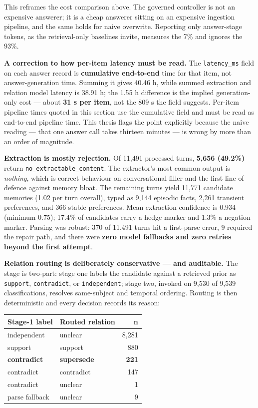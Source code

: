 This reframes the cost comparison above. The governed controller is not
an expensive answerer; it is a cheap answerer sitting on an expensive
ingestion pipeline, and the same holds for naive overwrite. Reporting
only answer-stage tokens, as the retrieval-only baselines invite,
measures the 7\% and ignores the 93\%.

\textbf{A correction to how per-item latency must be read.} The
\texttt{latency\_ms} field on each answer record is \textbf{cumulative
end-to-end} time for that item, not answer-generation time. Summing it
gives 40.46 h, while summed extraction and relation model latency is
38.91 h; the 1.55 h difference is the implied generation-only cost ---
about \textbf{31 s per item}, not the 809 s the field suggests. Per-item
pipeline times quoted in this section use the cumulative field and must
be read as end-to-end pipeline time. This thesis flags the point
explicitly because the naive reading --- that one answer call takes
thirteen minutes --- is wrong by more than an order of magnitude.

\textbf{Extraction is mostly rejection.} Of 11,491 processed turns,
\textbf{5,656 (49.2\%)} return \texttt{no\_extractable\_content}. The
extractor's most common output is \emph{nothing}, which is correct
behaviour on conversational filler and the first line of defence against
memory bloat. The remaining turns yield 11,771 candidate memories (1.02
per turn overall), typed as 9,144 episodic facts, 2,261 transient
preferences, and 366 stable preferences. Mean extraction confidence is
0.934 (minimum 0.75); 17.4\% of candidates carry a hedge marker and
1.3\% a negation marker. Parsing was robust: 370 of 11,491 turns hit a
first-parse error, 9 required the repair path, and there were
\textbf{zero model fallbacks and zero retries beyond the first attempt}.

\textbf{Relation routing is deliberately conservative --- and
auditable.} The stage is two-part: stage one labels the candidate
against a retrieved prior as \texttt{support}, \texttt{contradict}, or
\texttt{independent}; stage two, invoked on 9,530 of 9,539
classifications, resolves same-subject and temporal ordering. Routing is
then deterministic and every decision records its reason:

{\def\LTcaptype{none} %
\begin{longtable}[]{@{}llr@{}}
\toprule\noalign{}
Stage-1 label & Routed relation & n \\
\midrule\noalign{}
\endhead
\bottomrule\noalign{}
\endlastfoot
independent & unclear & 8,281 \\
support & support & 880 \\
\textbf{contradict} & \textbf{supersede} & \textbf{221} \\
contradict & contradict & 147 \\
contradict & unclear & 1 \\
parse fallback & unclear & 9 \\
\end{longtable}
}

